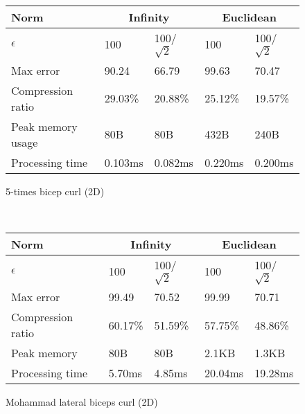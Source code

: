 \documentclass[10pt, conference, compsocconf]{IEEEtran}
\begin{document}
\begin{table}

    \begin{subfigure}{\columnwidth}
    \centering
    \begin{tabular}{l|l|l|l|l}
    \hline
    \rowcolor{headcolor}
    Norm                       & \multicolumn{2}{c|}{Infinity} & \multicolumn{2}{c}{Euclidean}\\ \hline
    $\epsilon$                & 100          & 100/$\sqrt{2}$  & 100         & 100/$\sqrt{2}$ \\
    Max error              & 90.24       & 66.79           & 99.63       & 70.47          \\ 
    Compression ratio      & 29.03\%      & 20.88\%         & 25.12\%     & 19.57\%        \\ 
    Peak memory usage      & 80B          & 80B             & 432B        & 240B           \\ 
    Processing time        & 0.103ms      & 0.082ms         & 0.220ms     & 0.200ms        \\ \hline
    \end{tabular}
    \caption{5-times bicep curl (2D)}
    \end{subfigure}\\
    \begin{subfigure}{\columnwidth}
    \centering
    \begin{tabular}{l|l|l|l|l}
    \hline
    \rowcolor{headcolor}
    Norm               & \multicolumn{2}{c|}{Infinity} & \multicolumn{2}{c}{Euclidean} \\ \hline
    $\epsilon$             & 100        & 100/$\sqrt{2}$    & 100        & 100/$\sqrt{2}$    \\ 
    Max error              & 99.49     & 70.52             & 99.99      & 70.71             \\ 
    Compression ratio      & 60.17\%    & 51.59\%           & 57.75\%    & 48.86\%           \\ 
    Peak memory       & 80B        & 80B               & 2.1KB      & 1.3KB             \\ 
    Processing time      & 5.70ms     & 4.85ms            & 20.04ms    & 19.28ms           \\ \hline
    \end{tabular}
    \caption{Mohammad lateral biceps curl (2D)}
    \end{subfigure}\\    
    \begin{subfigure}{\columnwidth}

\end{subfigure}
\end{table}
\end{document}
